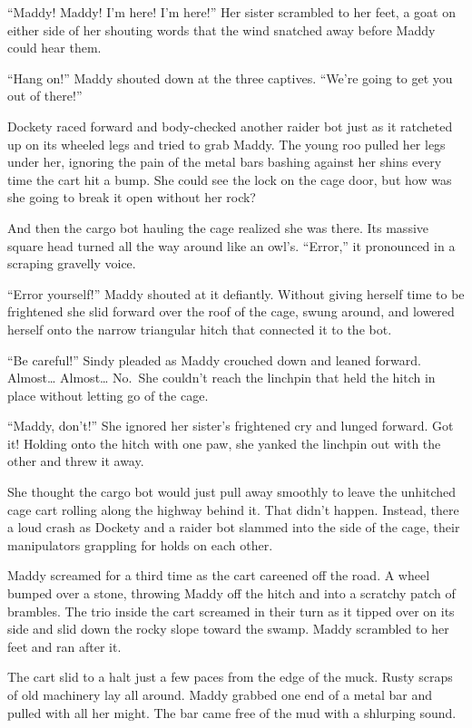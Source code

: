 \documentclass[10pt]{article}
\begin{document}
``Maddy! Maddy! I'm here! I'm here!'' Her sister scrambled to her feet,
a goat on either side of her shouting words that the wind snatched away
before Maddy could hear them.

``Hang on!'' Maddy shouted down at the three captives. ``We're going to
get you out of there!''

Dockety raced forward and body-checked another raider bot just as it
ratcheted up on its wheeled legs and tried to grab Maddy. The young roo
pulled her legs under her, ignoring the pain of the metal bars bashing
against her shins every time the cart hit a bump. She could see the lock
on the cage door, but how was she going to break it open without her
rock?

And then the cargo bot hauling the cage realized she was there. Its
massive square head turned all the way around like an owl's. ``Error,''
it pronounced in a scraping gravelly voice.

``Error yourself!'' Maddy shouted at it defiantly. Without giving
herself time to be frightened she slid forward over the roof of the
cage, swung around, and lowered herself onto the narrow triangular hitch
that connected it to the bot.

``Be careful!'' Sindy pleaded as Maddy crouched down and leaned forward.
Almost\ldots{} Almost\ldots{} No.~She couldn't reach the linchpin that
held the hitch in place without letting go of the cage.

``Maddy, don't!'' She ignored her sister's frightened cry and lunged
forward. Got it! Holding onto the hitch with one paw, she yanked the
linchpin out with the other and threw it away.

She thought the cargo bot would just pull away smoothly to leave the
unhitched cage cart rolling along the highway behind it. That didn't
happen. Instead, there a loud crash as Dockety and a raider bot slammed
into the side of the cage, their manipulators grappling for holds on
each other.

Maddy screamed for a third time as the cart careened off the road. A
wheel bumped over a stone, throwing Maddy off the hitch and into a
scratchy patch of brambles. The trio inside the cart screamed in their
turn as it tipped over on its side and slid down the rocky slope toward
the swamp. Maddy scrambled to her feet and ran after it.

The cart slid to a halt just a few paces from the edge of the muck.
Rusty scraps of old machinery lay all around. Maddy grabbed one end of a
metal bar and pulled with all her might. The bar came free of the mud
with a shlurping sound.
\end{document}
